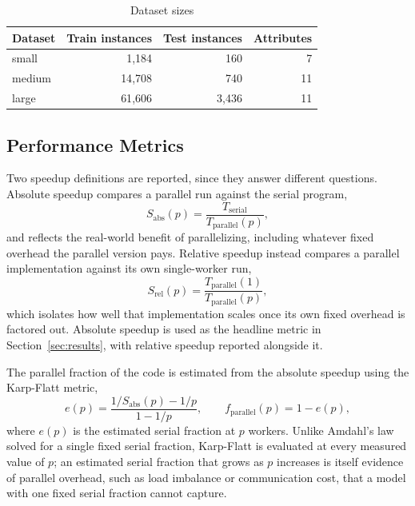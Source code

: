 \documentclass[conference]{IEEEtran}
\begin{document}
\begin{table}[htbp]
\caption{Dataset sizes}
\label{tab:datasets}
\centering
\begin{tabular}{lrrr}
\toprule
Dataset & Train instances & Test instances & Attributes \\
\midrule
small  & 1{,}184  & 160   & 7 \\
medium & 14{,}708 & 740   & 11 \\
large  & 61{,}606 & 3{,}436 & 11 \\
\bottomrule
\end{tabular}
\end{table}

\subsection{Performance Metrics}

Two speedup definitions are reported, since they answer different
questions. Absolute speedup compares a parallel run against the serial
program,
\begin{equation}
S_{\text{abs}}(p) = \frac{T_{\text{serial}}}{T_{\text{parallel}}(p)},
\label{eq:abs}
\end{equation}
and reflects the real-world benefit of parallelizing, including whatever
fixed overhead the parallel version pays. Relative speedup instead
compares a parallel implementation against its own single-worker run,
\begin{equation}
S_{\text{rel}}(p) = \frac{T_{\text{parallel}}(1)}{T_{\text{parallel}}(p)},
\label{eq:rel}
\end{equation}
which isolates how well that implementation scales once its own fixed
overhead is factored out. Absolute speedup is used as the headline metric
in Section~\ref{sec:results}, with relative speedup reported alongside it.

The parallel fraction of the code is estimated from the absolute speedup
using the Karp-Flatt metric,
\begin{equation}
e(p) = \frac{1/S_{\text{abs}}(p) - 1/p}{1 - 1/p}, \qquad
f_{\text{parallel}}(p) = 1 - e(p),
\label{eq:karpflatt}
\end{equation}
where $e(p)$ is the estimated serial fraction at $p$ workers. Unlike
Amdahl's law solved for a single fixed serial fraction, Karp-Flatt is
evaluated at every measured value of $p$; an estimated serial fraction that
grows as $p$ increases is itself evidence of parallel overhead, such as
load imbalance or communication cost, that a model with one fixed serial
fraction cannot capture.
\end{document}
